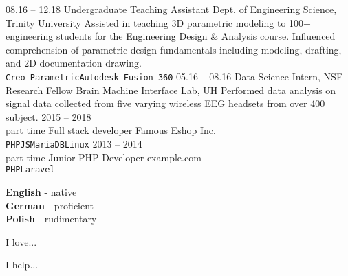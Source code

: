 \documentclass[9pt]{developercv} %
\begin{document}
\begin{entrylist}
	\entry
		{08.16 -- 12.18}
		{Undergraduate Teaching Assistant}
		{Dept. of Engineering Science, Trinity University}
		{Assisted in teaching 3D parametric modeling to 100+ engineering students for the Engineering Design \& Analysis course. Influenced comprehension of parametric design fundamentals including modeling, drafting, and 2D documentation drawing. \\ \texttt{Creo Parametric}\slashsep\texttt{Autodesk Fusion 360}}
	\entry
		{05.16 -- 08.16}
		{Data Science Intern, NSF Research Fellow}
		{Brain Machine Interface Lab, UH}
		{Performed data analysis on signal data collected from five varying wireless EEG headsets from over 400 subject. }
	\entry
		{2015 -- 2018\\\footnotesize{part time}}
		{Full stack developer}
		{Famous Eshop Inc.}
		{\lorem\lorem\\ \texttt{PHP}\slashsep\texttt{JS}\slashsep\texttt{MariaDB}\slashsep\texttt{Linux}}
	\entry
		{2013 -- 2014\\\footnotesize{part time}}
		{Junior PHP Developer}
		{example.com}
		{\lorem\lorem\\ \texttt{PHP}\slashsep\texttt{Laravel}}
\end{entrylist}



\begin{minipage}[t]{0.3\textwidth}
	\vspace{-\baselineskip} %

	
	\textbf{English} - native\\
	\textbf{German} - proficient\\
	\textbf{Polish} - rudimentary
\end{minipage}
\hfill
\begin{minipage}[t]{0.3\textwidth}
	\vspace{-\baselineskip} %
	
	
	I love... \lorem
\end{minipage}
\hfill
\begin{minipage}[t]{0.3\textwidth}
	\vspace{-\baselineskip} %
	
	
	I help... \lorem
\end{minipage}

\end{document}
